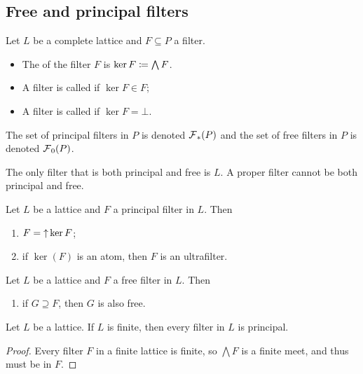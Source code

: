 \subsection{Free and principal filters}
\begin{definition}
Let $L$ be a complete lattice and $F\subseteq P$ a filter.
\begin{itemize}
\item The  of the filter $F$ is $\ker F \coloneqq \bigwedge F$.
\item A filter is called  if $\ker F \in F$;
\item A filter is called  if $\ker F = \bot$.
\end{itemize}
The set of principal filters in $P$ is denoted $\operatorname{\mathcal{F}}_*(P)$ and the set of free filters in $P$ is denoted $\operatorname{\mathcal{F}}_0(P)$.
\end{definition}
The only filter that is both principal and free is $L$. A proper filter cannot be both principal and free.

\begin{lemma}
Let $L$ be a lattice and $F$ a principal filter in $L$. Then
\begin{enumerate}
\item $F = \operatorname{\uparrow} \ker F$;
\item if $\ker(F)$ is an atom, then $F$ is an ultrafilter.
\end{enumerate}
\end{lemma}

\begin{lemma}
Let $L$ be a lattice and $F$ a free filter in $L$. Then
\begin{enumerate}
\item if $G\supseteq F$, then $G$ is also free.
\end{enumerate}
\end{lemma}

\begin{lemma} \label{finiteFiltersPrincipal}
Let $L$ be a lattice. If $L$ is finite, then every filter in $L$ is principal.
\end{lemma}
\begin{proof}
Every filter $F$ in a finite lattice is finite, so $\bigwedge F$ is a finite meet, and thus must be in $F$.
\end{proof}

